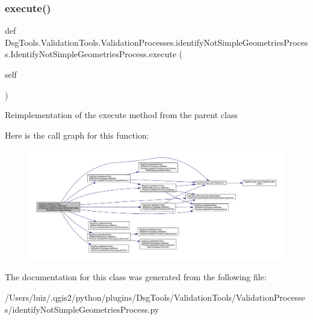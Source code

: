 \subsubsection{\texorpdfstring{execute()}{execute()}}
{\footnotesize\ttfamily def Dsg\+Tools.\+Validation\+Tools.\+Validation\+Processes.\+identify\+Not\+Simple\+Geometries\+Process.\+Identify\+Not\+Simple\+Geometries\+Process.\+execute (\begin{DoxyParamCaption}\item[{}]{self }\end{DoxyParamCaption})}

\begin{DoxyVerb}Reimplementation of the execute method from the parent class
\end{DoxyVerb}
 Here is the call graph for this function\+:
\nopagebreak
\begin{figure}[H]
\begin{center}
\leavevmode
\includegraphics[width=350pt]{class_dsg_tools_1_1_validation_tools_1_1_validation_processes_1_1identify_not_simple_geometries_cc91ad4d87ecabb6a33270acc62526dc_a95e5f63e116d35b1b34789a1b58d4d5a_cgraph}
\end{center}
\end{figure}


The documentation for this class was generated from the following file\+:\begin{DoxyCompactItemize}
\item 
/\+Users/luiz/.\+qgis2/python/plugins/\+Dsg\+Tools/\+Validation\+Tools/\+Validation\+Processes/identify\+Not\+Simple\+Geometries\+Process.\+py\end{DoxyCompactItemize}
